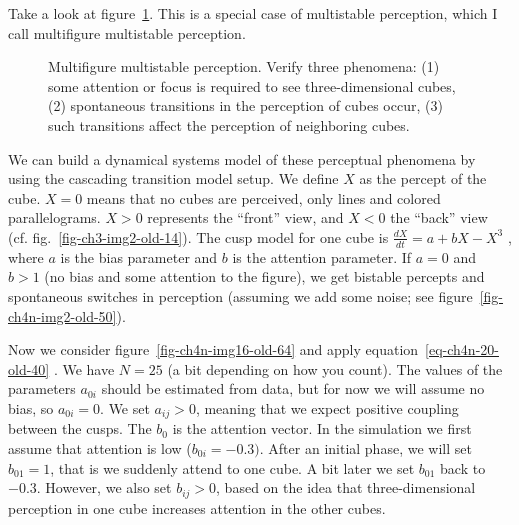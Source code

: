\documentclass[
  a4paper,
  DIV=11,
  numbers=noendperiod,
  oneside]{scrreprt}
\begin{document}
Take a look at figure~\ref{fig-ch4n-img18-old-66}. This is a special
case of multistable perception, which I call multifigure multistable
perception.

\begin{figure}


\caption{\label{fig-ch4n-img18-old-66}Multifigure multistable
perception. Verify three phenomena: (1) some attention or focus is
required to see three-dimensional cubes, (2) spontaneous transitions in
the perception of cubes occur, (3) such transitions affect the
perception of neighboring cubes.}

\end{figure}%

We can build a dynamical systems model of these perceptual phenomena by
using the cascading transition model setup. We define \(X\) as the
percept of the cube. \(X = 0\) means that no cubes are perceived, only
lines and colored parallelograms. \(X > 0\) represents the ``front''
view, and \(X < 0\) the ``back'' view (cf.
fig.~\ref{fig-ch3-img2-old-14}). The cusp model for one cube is
\(\frac{dX}{dt} = {a + bX - X}^{3}\) , where \(a\) is the bias parameter
and \(b\) is the attention parameter. If \(a = 0\) and \(b > 1\) (no
bias and some attention to the figure), we get bistable percepts and
spontaneous switches in perception (assuming we add some noise; see
figure~\ref{fig-ch4n-img2-old-50}).

Now we consider figure~\ref{fig-ch4n-img16-old-64} and apply
equation~\ref{eq-ch4n-20-old-40} . We have \(N = 25\) (a bit depending
on how you count). The values of the parameters \(a_{0i}\) should be
estimated from data, but for now we will assume no bias, so
\(a_{0i} = 0\). We set \(a_{ij} > 0\), meaning that we expect positive
coupling between the cusps. The \(b_{0}\) is the attention vector. In
the simulation we first assume that attention is low
(\(b_{0i} = -0.3)\). After an initial phase, we will set \(b_{01} = 1\),
that is we suddenly attend to one cube. A bit later we set \(b_{01}\)
back to \(-0.3\). However, we also set \(b_{ij} > 0\), based on the idea
that three-dimensional perception in one cube increases attention in the
other cubes.
\end{document}
